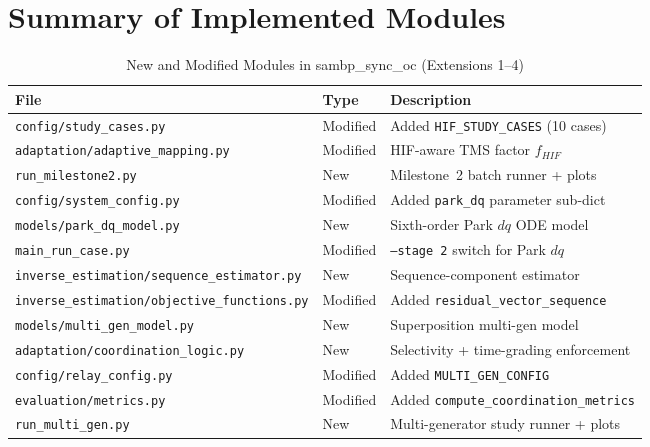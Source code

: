 \documentclass[12pt,a4paper]{article}
\theoremstyle{definition}
\theoremstyle{plain}
\begin{document}
\section{Summary of Implemented Modules}
\label{app:modules}

\begin{table}[H]
  \centering
  \caption{New and Modified Modules in sambp\_sync\_oc (Extensions 1--4)}
  \label{tab:modules}
  \small
  \begin{tabular}{@{}lll@{}}
    \toprule
    File & Type & Description \\
    \midrule
    \texttt{config/study\_cases.py}              & Modified & Added \texttt{HIF\_STUDY\_CASES} (10 cases) \\
    \texttt{adaptation/adaptive\_mapping.py}     & Modified & HIF-aware TMS factor $f_{HIF}$ \\
    \texttt{run\_milestone2.py}                  & New      & Milestone~2 batch runner + plots \\
    \texttt{config/system\_config.py}            & Modified & Added \texttt{park\_dq} parameter sub-dict \\
    \texttt{models/park\_dq\_model.py}           & New      & Sixth-order Park $dq$ ODE model \\
    \texttt{main\_run\_case.py}                  & Modified & \texttt{--stage 2} switch for Park $dq$ \\
    \texttt{inverse\_estimation/sequence\_estimator.py} & New & Sequence-component estimator \\
    \texttt{inverse\_estimation/objective\_functions.py} & Modified & Added \texttt{residual\_vector\_sequence} \\
    \texttt{models/multi\_gen\_model.py}         & New      & Superposition multi-gen model \\
    \texttt{adaptation/coordination\_logic.py}   & New      & Selectivity + time-grading enforcement \\
    \texttt{config/relay\_config.py}             & Modified & Added \texttt{MULTI\_GEN\_CONFIG} \\
    \texttt{evaluation/metrics.py}               & Modified & Added \texttt{compute\_coordination\_metrics} \\
    \texttt{run\_multi\_gen.py}                  & New      & Multi-generator study runner + plots \\
    \bottomrule
  \end{tabular}
\end{table}

\newpage

\end{document}

